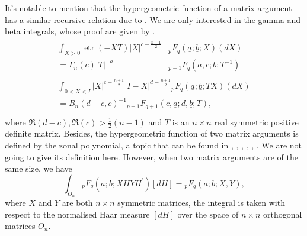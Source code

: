 \documentclass{amsart}
\newtheorem{proposition}[theorem]{Proposition}
\theoremstyle{definition}
\numberwithin{equation}{section}
\begin{document}
It's notable to mention that the hypergeometric function of a matrix argument has a similar recursive relation due to \cite{herz1955}. We are only interested in the gamma and beta integrals, whose proof are given by \cite{constantine1963some}.
	\begin{eqnarray}
	    \begin{aligned}\int_{X>0} \operatorname{etr}(-XT) |X|^{c - \frac{n+1}{2}} &{}_{p}F_{q} (\underline{a};\underline{b}; X) (dX)\\		= \varGamma_{n}(c) |T|^{-a} &{}_{p+1}F_{q} (\underline{a},c;\underline{b}; T^{-1}) 	\end{aligned}\\
	    \begin{aligned}
    	\int_{0< X < I} |X|^{c - \frac{n+1}{2}} |I-X|^{d - \frac{n+1}{2}} {}_{p}F_{q} \left(\underline{a};\underline{b}; TX\right) (dX)\\
		= {B_{n} (d-c,c)}^{-1}{}_{p+1}F_{q+1} \left(c,\underline{a};d,\underline{b}; T\right),\\
	\end{aligned}
        \label{eq: hypergeometric function1}
	\end{eqnarray}
where $\Re (d-c), \Re (c) > \frac{1}{2}(n-1)$ and $T$ is an $n \times n$ real symmetric positive definite matrix. Besides, the hypergeometric function of two matrix arguments is defined by the zonal polynomial, a topic that can be found in \cite{hua1963harmonic}, \cite{muirhead1982aspects}, \cite{Vilenkin2010RepresentationOL}, \cite{macdonald1998symmetric}, \cite{shimizu2022}, \cite{wang2025matrix}. We are not going to give its definition here. However, when two matrix arguments are of the same size, we have 
\begin{equation}
    \int_{O_n} {}_{p}F_{q}\left(\underline{a};\underline{b}; X H Y H^{\prime}\right) [dH] = {}_{p}F_{q}\left(\underline{a};\underline{b}; X, Y\right),
\end{equation}
where $ X$ and $ Y$ are both $n \times n$ symmetric matrices, the integral is taken with respect to the normalised Haar measure $[dH]$ over the space of $n\times n$ orthogonal matrices $O_n$. 
\end{document}
